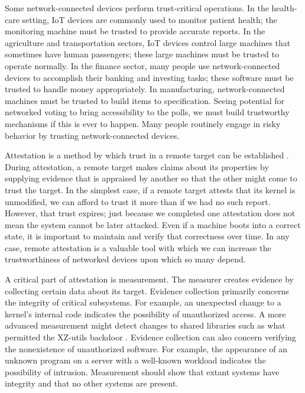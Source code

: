 \documentclass[a4paper,twoside]{article}
\begin{document}
Some network-connected devices perform trust-critical operations. In the health-care setting, IoT devices are commonly used to monitor patient health; the monitoring machine must be trusted to provide accurate reports. In the agriculture and transportation sectors, IoT devices control large machines that sometimes have human passengers; these large machines must be trusted to operate normally. In the finance sector, many people use network-connected devices to accomplish their banking and investing tasks; these software must be trusted to handle money appropriately. In manufacturing, network-connected machines must be trusted to build items to specification. Seeing potential for networked voting to bring accessibility to the polls, we must build trustworthy mechanisms if this is ever to happen. Many people routinely engage in risky behavior by trusting network-connected devices.

Attestation is a method by which trust in a remote target can be established \cite{Principles}. During attestation, a remote target makes claims about its properties by supplying evidence that is appraised by another so that the other might come to trust the target. In the simplest case, if a remote target attests that its kernel is unmodified, we can afford to trust it more than if we had no such report. However, that trust expires; just because we completed one attestation does not mean the system cannot be later attacked. Even if a machine boots into a correct state, it is important to maintain and verify that correctness over time. In any case, remote attestation is a valuable tool with which we can increase the trustworthiness of networked devices upon which so many depend.

A critical part of attestation is measurement. The measurer creates evidence by collecting certain data about its target. Evidence collection primarily concerns the integrity of critical subsystems. For example, an unexpected change to a kernel's internal code indicates the possibility of unauthorized access. A more advanced measurement might detect changes to shared libraries such as what permitted the XZ-utils backdoor \cite{xzutils}. Evidence collection can also concern verifying the nonexistence of unauthorized software. For example, the appearance of an unknown program on a server with a well-known workload indicates the possibility of intrusion. Measurement should show that extant systems have integrity and that no other systems are present.
\end{document}
